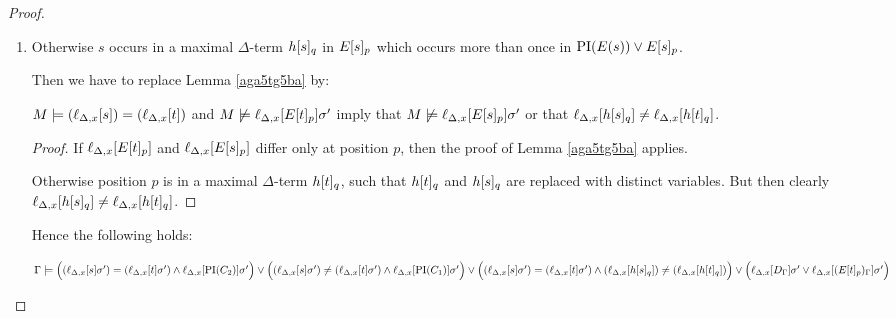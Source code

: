 \documentclass[,%
	paper=a4,%
	DIV14, 
	liststotoc,
	bibtotoc,
	draft=false,%
	numbers=noendperiod
]{scrartcl}
\newcommand{\lif}[1]{\lift{\Delta}{#1}{x}}
\begin{document}
\begin{proof}
\begin{description}
\begin{enumerate}
			\item Otherwise $s$ occurs in a maximal $\Delta$-term $h{[s]_{q}}$ in $E{[s]_{p}}$ which occurs more than once in $\operatorname{PI}(E(s)) \lor E{[s]_{p}}$.


				\newenvironment{lemmaCustomNo}[1]
				{\renewcommand{\thelemma}{\ref{#1}$'$}%
					\addtocounter{lemma}{-1}%
				\begin{lemma}}
				{\end{lemma}}


				Then we have to replace Lemma \ref{aga5tg5ba} by:
				\begin{lemmaCustomNo}{aga5tg5ba}
					$M \entails (\lif{s}) = (\lif{t})$ and $M\notentails \lif{E\occurat{t}{p}}\sigma'$ imply that $M\notentails \lif{E\occurat{s}{p}}\sigma'$ or that $\lif{h\occurat{s}{q}} \neq \lif{h\occurat{t}{q}}$.
				\end{lemmaCustomNo}
				\begin{proof}
					If $\lif{E\occurat{t}{p}}$ and $\lif{E\occurat{s}{p}}$ differ only at position $p$, then the proof of Lemma \ref{aga5tg5ba} applies.
					
					Otherwise position $p$ is in a maximal $\Delta$-term $h{[t]_{q}}$, such that $h{[t]_{q}}$ and $h{[s]_{q}}$ are replaced with distinct variables.
					But then clearly $\lif{h\occurat{s}{q}} \neq \lif{h\occurat{t}{q}}$.
				\end{proof}
 Hence the following holds:

				$\Gamma \entails
				\Big((\lif{s}\sigma')=(\lif{t}\sigma') \land \lif{\PI(C_2)}\sigma'\Big) \lor
				\Big((\lif{s}\sigma')\neq(\lif{t}\sigma') \land \lif{\PI(C_1)}\sigma'\Big) \lor
				\Big((\lif{s}\sigma')=(\lif{t}\sigma') \land (\lif{h\occurat{s}{q}}) \neq (\lif{h\occurat{t}{q}} )\Big) \lor
				\Big(\lif{D_\Gamma}\sigma' \lor \lif{(E\occurat{t}{p})_\Gamma}\sigma'\Big)$
				\qedhere
		\end{enumerate}


		\begin{comment}



			easy case:
			$\PI(C) = [ ( s=t \land \PI(C_2) ) \lor (s\neq t \land \PI(C_1)) ]\sigma$

			to show:
			$\Gamma \entails \lif{ [ (( s=t \land \PI(C_2) ) \lor (s\neq t \land \PI(C_1))) \lor (D \lor E[t]) ]\sigma} $

			proof idea: either $s=t$, then also $\PI(C_2)$, or else $s\neq t$, but then also $\PI(C_1)$

			by lemma \ref{lemma:lif} for $\sigma'$ as in lemma, 
			$\Gamma \entails \lif{ (( s=t \land \PI(C_2) ) \lor (s\neq t \land \PI(C_1))) \lor (D \lor E[t]) }\sigma' $


\end{comment}
\end{description}
\end{proof}
\end{document}
